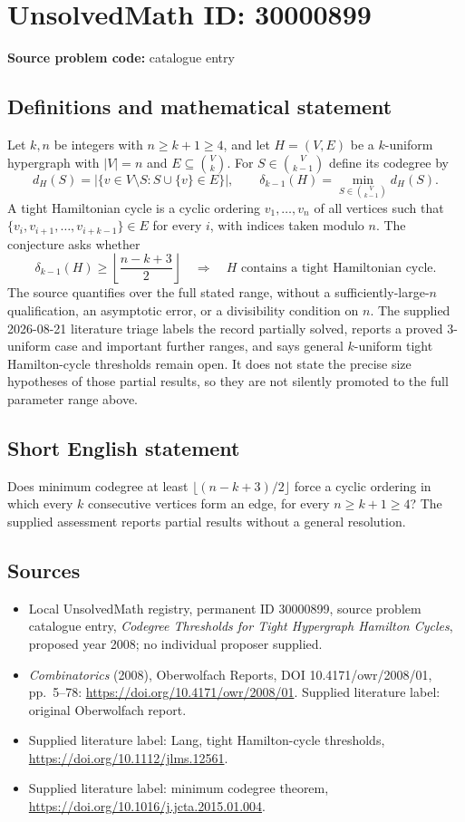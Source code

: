 \documentclass[11pt]{article}
\begin{document}
\section*{UnsolvedMath ID: 30000899}
\textbf{Source problem code:} catalogue entry
\subsection{Definitions and mathematical statement}
Let $k,n$ be integers with $n\geq k+1\geq4$, and let $H=(V,E)$ be a $k$-uniform hypergraph with $|V|=n$ and $E\subseteq\binom Vk$. For $S\in\binom V{k-1}$ define its codegree by \[d_H(S)=|\{v\in V\setminus S:S\cup\{v\}\in E\}|,\qquad\delta_{k-1}(H)=\min_{S\in\binom V{k-1}}d_H(S).\] A tight Hamiltonian cycle is a cyclic ordering $v_1,\ldots,v_n$ of all vertices such that $\{v_i,v_{i+1},\ldots,v_{i+k-1}\}\in E$ for every $i$, with indices taken modulo $n$. The conjecture asks whether \[\delta_{k-1}(H)\geq\left\lfloor\frac{n-k+3}{2}\right\rfloor\quad\Longrightarrow\quad H\text{ contains a tight Hamiltonian cycle}.\] The source quantifies over the full stated range, without a sufficiently-large-$n$ qualification, an asymptotic error, or a divisibility condition on $n$. The supplied 2026-08-21 literature triage labels the record partially solved, reports a proved $3$-uniform case and important further ranges, and says general $k$-uniform tight Hamilton-cycle thresholds remain open. It does not state the precise size hypotheses of those partial results, so they are not silently promoted to the full parameter range above.
\subsection{Short English statement}
Does minimum codegree at least $\lfloor(n-k+3)/2\rfloor$ force a cyclic ordering in which every $k$ consecutive vertices form an edge, for every $n\geq k+1\geq4$? The supplied assessment reports partial results without a general resolution.
\subsection{Sources}
\begin{itemize}\item Local UnsolvedMath registry, permanent ID 30000899, source problem catalogue entry, \emph{Codegree Thresholds for Tight Hypergraph Hamilton Cycles}, proposed year 2008; no individual proposer supplied.\item \emph{Combinatorics} (2008), Oberwolfach Reports, DOI 10.4171/owr/2008/01, pp.\ 5--78: \url{https://doi.org/10.4171/owr/2008/01}. Supplied literature label: original Oberwolfach report.\item Supplied literature label: Lang, tight Hamilton-cycle thresholds, \url{https://doi.org/10.1112/jlms.12561}.\item Supplied literature label: minimum codegree theorem, \url{https://doi.org/10.1016/j.jcta.2015.01.004}.\end{itemize}
\end{document}
